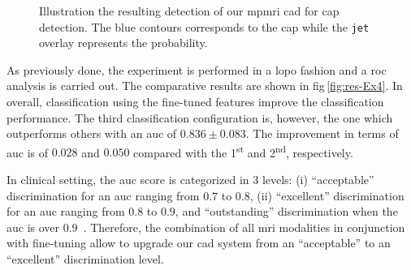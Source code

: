 \begin{landscape}
\begin{figure}
  \hfill
  \hfill
  \hspace*{\fill}
  \caption[Illustration the resulting detection of our \acs*{mpmri} \acs*{cad} for \acs*{cap} detection.]{Illustration the resulting detection of our \acs*{mpmri} \acs*{cad} for \acs*{cap} detection. The blue contours corresponds to the \ac{cap} while the \texttt{jet} overlay represents the probability.}
  \label{fig:resultcad}
\end{figure}
\end{landscape}

As previously done, the experiment is performed in a \ac{lopo} fashion and a \ac{roc} analysis is carried out.
The comparative results are shown in \acs{fig}\,\ref{fig:res-Ex4}.
In overall, classification using the fine-tuned features improve the classification performance.
The third classification configuration is, however, the one which outperforms others with an \ac{auc} of $0.836 \pm 0.083$.
The improvement in terms of \ac{auc} is of $0.028$ and $0.050$ compared with the 1\textsuperscript{st} and 2\textsuperscript{nd}, respectively.

In clinical setting, the \ac{auc} score is categorized in 3 levels: (i) ``acceptable'' discrimination for an \ac{auc} ranging from $0.7$ to $0.8$, (ii) ``excellent'' discrimination for an \ac{auc} ranging from $0.8$ to $0.9$, and ``outstanding'' discrimination when the \ac{auc} is over $0.9$~\cite{hosmer2004applied}.
Therefore, the combination of all \ac{mri} modalities in conjunction with fine-tuning allow to upgrade our \ac{cad} system from an ``acceptable'' to an ``excellent'' discrimination level.

